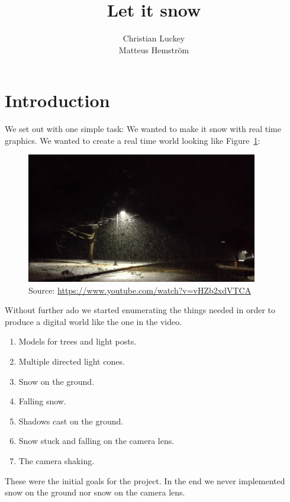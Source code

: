 \documentclass[a4paper,12pt]{article}
\title{Let it snow}
\author{Christian Luckey \\ Matteus Hemström}
\begin{document}
\maketitle

\newpage



\section{Introduction}

We set out with one simple task: We wanted to make it snow with real time graphics. We wanted to create a real time world looking like Figure~\ref{fig:youtube}:

\begin{figure}[ht]
  \centering
  \includegraphics[width=0.9\textwidth]{youtube}
  \caption{\label{fig:youtube} Source: \href{https://www.youtube.com/watch?v=vHZb2xdVTCA}{https://www.youtube.com/watch?v=vHZb2xdVTCA}}
\end{figure}

\noindent
Without further ado we started enumerating the things needed in order to produce a digital world like the one in the video.

\begin{enumerate}
  \item Models for trees and light posts.
  \item Multiple directed light cones.
  \item Snow on the ground.
  \item Falling snow.
  \item Shadows cast on the ground.
  \item Snow stuck and falling on the camera lens.
  \item The camera shaking.
\end{enumerate}

\noindent
These were the initial goals for the project. In the end we never implemented snow on the ground nor snow on the camera lens.
\end{document}
